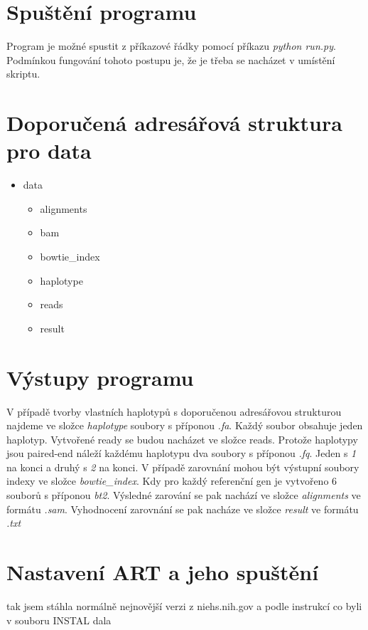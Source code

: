 \documentclass[czech,DP]{thesiskiv}
\numberwithin{equation}{section}
\begin{document}
\section{Spuštění programu}
Program je možné spustit z příkazové řádky pomocí příkazu \textit {python run.py}. Podmínkou fungování tohoto postupu je, že je třeba se nacházet v umístění skriptu. 

\section{Doporučená adresářová struktura pro data}
\begin{itemize}
	\item data
		\begin{itemize}
			\item alignments
			\item bam
			\item bowtie\_index
			\item haplotype
			\item reads
			\item result
		\end{itemize}
\end{itemize}

\section{Výstupy programu}
V případě tvorby vlastních haplotypů s doporučenou adresářovou strukturou najdeme ve složce \textit{haplotype} soubory s příponou \textit{.fa}. Každý soubor obsahuje jeden haplotyp.
Vytvořené ready se budou nacházet ve složce reads. Protože haplotypy jsou paired-end náleží každému haplotypu dva soubory s příponou \textit{.fq}. Jeden s \textit{1} na konci a druhý s \textit{2} na konci. 
V případě zarovnání mohou být výstupní soubory indexy ve složce \textit{bowtie\_index}. Kdy pro každý referenční gen je vytvořeno 6 souborů s příponou \textit{bt2}. Výsledné zarování se pak nachází ve složce \textit{alignments} ve formátu \textit{.sam}. Vyhodnocení zarovnání se pak nacháze ve složce \textit{result} ve formátu \textit{.txt}

\section{Nastavení ART a jeho spuštění}
tak jsem stáhla normálně nejnovější verzi z niehs.nih.gov a podle instrukcí co byli v souboru INSTAL dala %
\end{document}
